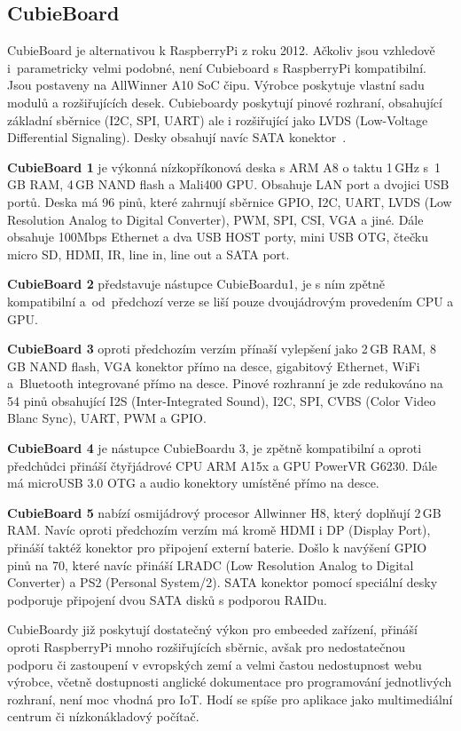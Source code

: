 	\subsection{CubieBoard}
	\label{KapCubie}
			CubieBoard je alternativou k RaspberryPi z roku 2012. Ačkoliv jsou vzhledově i~parametricky velmi podobné, není Cubieboard s RaspberryPi kompatibilní. Jsou postaveny na AllWinner A10 SoC čipu. Výrobce poskytuje vlastní sadu modulů a rozšiřujících desek. Cubieboardy poskytují pinové rozhraní, obsahující základní sběrnice (I2C, SPI, UART) ale i rozšiřující jako LVDS (Low-Voltage Differential Signaling). Desky obsahují navíc SATA konektor~\cite{CubieBoards}.
	
	\textbf{CubieBoard 1} je výkonná nízkopříkonová deska s ARM A8 o taktu 1\,GHz s~1\,GB RAM, 4\,GB NAND flash a Mali400 GPU. Obsahuje LAN port a dvojici USB portů. Deska má 96 pinů, které zahrnují sběrnice GPIO, I2C, UART, LVDS (Low Resolution Analog to Digital Converter), PWM, SPI, CSI, VGA a jiné. Dále obsahuje 100Mbps Ethernet a dva USB HOST porty, mini USB OTG, čtečku micro SD, HDMI, IR, line in, line out a SATA port.
	
	\textbf{CubieBoard 2} představuje nástupce CubieBoardu1, je s ním zpětně kompatibilní a~od~předchozí verze se liší pouze dvoujádrovým provedením CPU a GPU.
		
	\textbf{CubieBoard 3} oproti předchozím verzím přínaší vylepšení jako 2\,GB RAM, 8\,GB NAND flash, VGA konektor přímo na desce, gigabitový Ethernet, WiFi a~Bluetooth integrované přímo na desce. Pinové rozhranní je zde redukováno na 54 pinů obsahující I2S (Inter-Integrated Sound), I2C, SPI, CVBS (Color Video Blanc Sync), UART, PWM a GPIO.
	
		\textbf{CubieBoard 4} je nástupce CubieBoardu 3, je zpětně kompatibilní a oproti předchůdci přináší čtyřjádrové CPU ARM A15x a GPU PowerVR G6230. Dále má microUSB 3.0 OTG a audio konektory umístěné přímo na desce.
		
			\textbf{CubieBoard 5 }nabízí osmijádrový procesor Allwinner H8, který doplňují 2\,GB RAM. Navíc oproti předchozím verzím má kromě HDMI i DP (Display Port), přináší taktéž konektor pro připojení externí baterie. Došlo k navýšení GPIO pinů na 70, které navíc přináší LRADC (Low Resolution Analog to Digital Converter) a PS2 (Personal System/2). SATA konektor pomocí speciální desky podporuje připojení dvou SATA disků s podporou RAIDu.
		
CubieBoardy již poskytují dostatečný výkon pro embeeded zařízení, přináší oproti RaspberryPi mnoho rozšiřujících sběrnic, avšak pro nedostatečnou podporu či zastoupení v evropských zemí a velmi častou nedostupnost webu výrobce, včetně dostupnosti anglické dokumentace pro  programování jednotlivých rozhraní, není moc vhodná pro IoT. Hodí se spíše pro aplikace jako multimediální centrum či nízkonákladový počítač. 	

